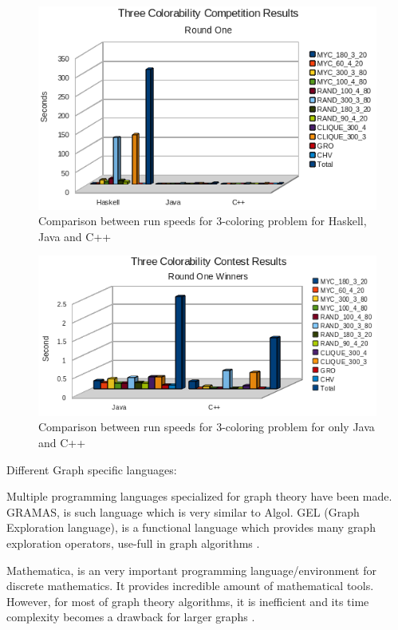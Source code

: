 \begin{figure}[H]
    \includegraphics[width=\textwidth]{images/comparison3langs.png}
    \caption{Comparison between run speeds for 3-coloring problem for Haskell, Java and C++ \parencite{fender_2011}}
\end{figure}
\begin{figure}[H]
    \includegraphics[width=\textwidth]{images/comparison2langs.png}
    \caption{Comparison between run speeds for 3-coloring problem for only Java and C++ \parencite{fender_2011}}
\end{figure}

Different Graph specific languages:

Multiple programming languages specialized for graph theory have been made. GRAMAS, \textcite{pape1979gramas} is such language which is very similar to Algol. GEL (Graph Exploration language), \textcite{erwig1992graph} is a functional language which provides many graph exploration operators, use-full in graph algorithms \parencite{king1996functional}. 

Mathematica, \textcite{wolfram1991mathematica} is an very important programming language/environment for discrete mathematics. It provides incredible amount of mathematical tools. However, for most of graph theory algorithms, it is inefficient and its time complexity becomes a drawback for larger graphs \parencite{king1996functional}. 

